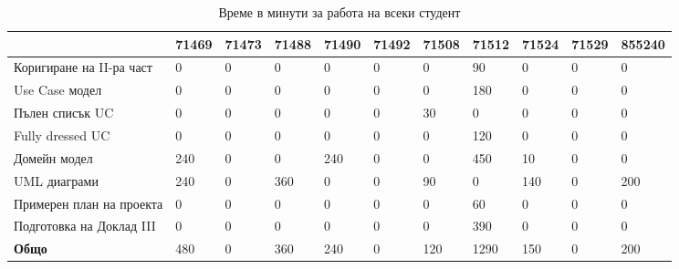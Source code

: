 \documentclass[a4paper]{article}
\begin{document}
\begin{table}[h]
\centering
\begin{tabular}{|l|l|l|l|l|l|l|l|l|l|l|}
\hline
                        	& 71469 & 71473 & 71488 & 71490 & 71492 & 71508 & 71512 & 71524 & 71529 & 855240 \\ \hline
Коригиране на II-ра част	& 0     & 0     & 0     & 0		& 0     & 0     & 90   	&  0    & 0     & 0      \\ \hline
Use Case модел				& 0     & 0     & 0     & 0		& 0     & 0     & 180  	&  0    & 0     & 0      \\ \hline
Пълен списък UC				& 0     & 0     & 0     & 0		& 0     & 30    & 0   	&  0    & 0     & 0      \\ \hline
Fully dressed UC			& 0     & 0     & 0     & 0		& 0     & 0     & 120  	&  0    & 0     & 0      \\ \hline
Домейн модел				& 240   & 0     & 0     & 240	& 0     & 0     & 450  	&  10   & 0     & 0      \\ \hline
UML диаграми				& 240   & 0     & 360   & 0		& 0     & 90    & 0   	&  140  & 0     & 200    \\ \hline
Примерен план на проекта	& 0     & 0     & 0     & 0		& 0     & 0     & 60   	&  0    & 0     & 0      \\ \hline
Подготовка на Доклад III	& 0     & 0     & 0     & 0		& 0     & 0     & 390  	&  0    & 0     & 0      \\ \hline
\textbf{Общо}				& 480   & 0     & 360   & 240	& 0     & 120   & 1290 	&  150  & 0     & 200    \\ \hline
\end{tabular}
\caption{Време в минути за работа на всеки студент}
\end{table}
\end{document}

